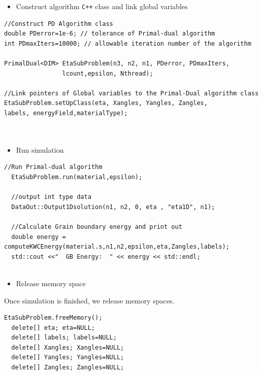 \documentclass[11pt]{article}
\begin{document}
\begin{itemize} \item Construct algorithm \texttt{C++} class
and link global variables \end{itemize}

\begin{tcolorbox}
\begin{lstlisting}[basicstyle=\footnotesize]
//Construct PD Algorithm class
double PDerror=1e-6; // tolerance of Primal-dual algorithm
int PDmaxIters=10000; // allowable iteration number of the algorithm

PrimalDual<DIM> EtaSubProblem(n3, n2, n1, PDerror, PDmaxIters,
				lcount,epsilon, Nthread);
  
//Link pointers of Global variables to the Primal-Dual algorithm class
EtaSubProblem.setUpClass(eta, Xangles, Yangles, Zangles,
labels, energyField,materialType);
  
  
\end{lstlisting}
\end{tcolorbox}

\begin{itemize} \item Run simulation \end{itemize}

\begin{tcolorbox}
\begin{lstlisting}[basicstyle=\footnotesize]
  //Run Primal-dual algorithm
  EtaSubProblem.run(material,epsilon);
  
  //output int type data
  DataOut::Output1Dsolution(n1, n2, 0, eta , "eta1D", n1);
  
  //Calculate Grain boundary energy and print out
  double energy = computeKWCEnergy(material.s,n1,n2,epsilon,eta,Zangles,labels);
  std::cout <<"  GB Energy:  " << energy << std::endl;
    
\end{lstlisting}
\end{tcolorbox}

\begin{itemize} \item Release memory space \end{itemize}
Once simulation is finished, we release memory spaces.
\begin{tcolorbox}
\begin{lstlisting}[basicstyle=\footnotesize]
  EtaSubProblem.freeMemory();	
  delete[] eta; eta=NULL;
  delete[] labels; labels=NULL;
  delete[] Xangles; Xangles=NULL;
  delete[] Yangles; Yangles=NULL;
  delete[] Zangles; Zangles=NULL;
\end{lstlisting}
\end{tcolorbox}
\end{document}
